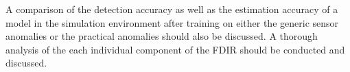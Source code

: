 A comparison of the detection accuracy as well as the estimation accuracy of a model in the simulation environment after training on either the generic sensor anomalies or the practical anomalies should also be discussed. A thorough analysis of the each individual component of the FDIR should be conducted and discussed. 

%



